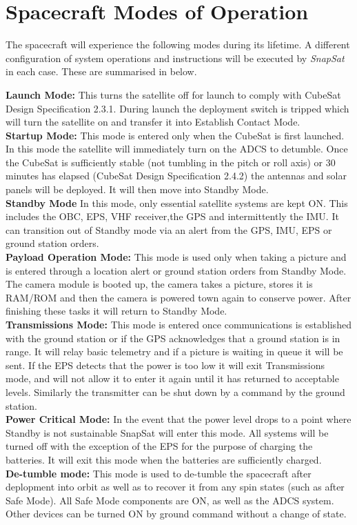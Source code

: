 \newpage
\section{Spacecraft Modes of Operation}
The spacecraft will experience the following modes during its lifetime. A different configuration of system operations and instructions will be executed by \textit{SnapSat} in each case. These are summarised in below.

\noindent
\textbf{Launch Mode: } This turns the satellite off for launch to comply with CubeSat Design Specification 2.3.1. During launch the deployment switch is tripped which will turn the satellite on and transfer it into Establish Contact Mode. \\
\noindent
\textbf{Startup Mode: }This mode is entered only when the CubeSat is first launched.  In this mode the satellite will immediately turn on the ADCS to detumble.  Once the CubeSat is sufficiently stable (not tumbling in the pitch or roll axis) or 30 minutes has elapsed (CubeSat Design Specification 2.4.2) the antennas and solar panels will be deployed. It will then move into Standby Mode. \\
\noindent
\textbf{Standby Mode }In this mode, only essential satellite systems are kept ON.  This includes the OBC, EPS, VHF receiver,the GPS and intermittently the IMU.  It can transition out of Standby mode via an alert from the GPS, IMU, EPS or ground station orders.  \\
\noindent
\textbf{Payload Operation Mode: } This mode is used only when taking a picture and is entered through a location alert or ground station orders from Standby Mode.  The camera module is booted up, the camera takes a picture, stores it is RAM/ROM and then the camera is powered town again to conserve power.  After finishing these tasks it will return to Standby Mode. \\
\noindent
\textbf{Transmissions Mode: } This mode is entered once communications is established with the ground station or if the GPS acknowledges that a ground station is in range.  It will relay basic telemetry and if a picture is waiting in queue it will be sent.  If the EPS detects that the power is too low it will exit Transmissions mode, and will not allow it to enter it again until it has returned to acceptable levels.  Similarly the transmitter can be shut down by a command by the ground station.\\
\noindent
\textbf{Power Critical Mode: } In the event that the power level drops to a point where Standby is not sustainable SnapSat will enter this mode.  All systems will be turned off with the exception of the EPS for the purpose of charging the batteries.  It will exit this mode when the batteries are sufficiently charged. \\
\noindent
\textbf{De-tumble mode: } This mode is used to de-tumble the spacecraft after deplopment into orbit as well as to recover it from any spin states (such as after Safe Mode). All Safe Mode components are ON, as well as the ADCS system. Other devices can be turned ON by ground command without a change of state. \\

